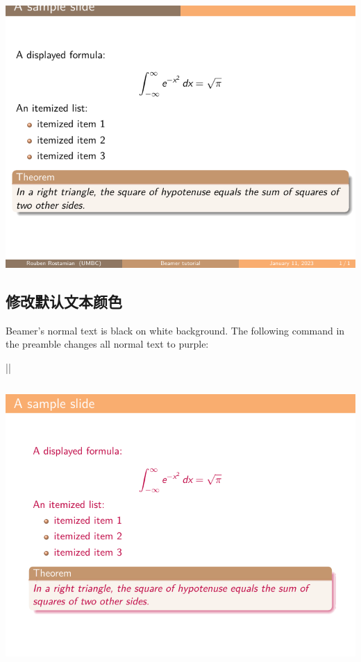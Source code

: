 \begin{column}{0.5\textwidth}
\inputminted[linenos=true]{latex}{examples/beamer/beamertheme06.tex}

\includegraphics{examples/beamer/beamertheme06.pdf}

\subsection{修改默认文本颜色}

Beamer’s normal text is black on white background. The following command in the preamble changes all normal text to purple:

||

\inputminted[linenos=true]{latex}{examples/beamer/beamertheme07.tex}

\includegraphics{examples/beamer/beamertheme07.pdf}


\end{column}
